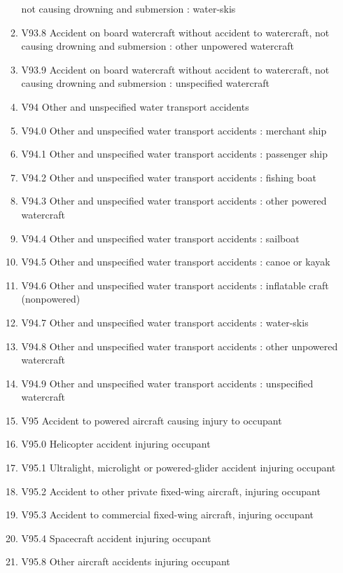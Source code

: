 \documentclass[
]{scrartcl}
\begin{document}
\begin{itemize}
\begin{enumerate}
    not causing drowning and submersion : water-skis
  \item
    V93.8 Accident on board watercraft without accident to watercraft,
    not causing drowning and submersion : other unpowered watercraft
  \item
    V93.9 Accident on board watercraft without accident to watercraft,
    not causing drowning and submersion : unspecified watercraft
  \item
    V94 Other and unspecified water transport accidents
  \item
    V94.0 Other and unspecified water transport accidents : merchant
    ship
  \item
    V94.1 Other and unspecified water transport accidents : passenger
    ship
  \item
    V94.2 Other and unspecified water transport accidents : fishing boat
  \item
    V94.3 Other and unspecified water transport accidents : other
    powered watercraft
  \item
    V94.4 Other and unspecified water transport accidents : sailboat
  \item
    V94.5 Other and unspecified water transport accidents : canoe or
    kayak
  \item
    V94.6 Other and unspecified water transport accidents : inflatable
    craft (nonpowered)
  \item
    V94.7 Other and unspecified water transport accidents : water-skis
  \item
    V94.8 Other and unspecified water transport accidents : other
    unpowered watercraft
  \item
    V94.9 Other and unspecified water transport accidents : unspecified
    watercraft
  \item
    V95 Accident to powered aircraft causing injury to occupant
  \item
    V95.0 Helicopter accident injuring occupant
  \item
    V95.1 Ultralight, microlight or powered-glider accident injuring
    occupant
  \item
    V95.2 Accident to other private fixed-wing aircraft, injuring
    occupant
  \item
    V95.3 Accident to commercial fixed-wing aircraft, injuring occupant
  \item
    V95.4 Spacecraft accident injuring occupant
  \item
    V95.8 Other aircraft accidents injuring occupant

\end{enumerate}
\end{itemize}
\end{document}
